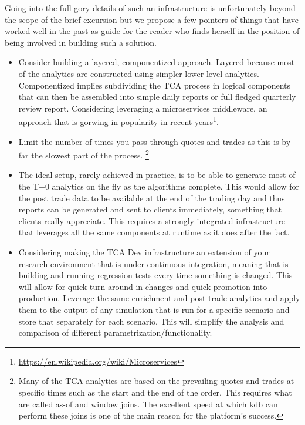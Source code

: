 Going into the full gory details of such an infrastructure is unfortunately beyond the scope of the brief excursion but we propose a few pointers of things that have worked well in the past as  guide for the reader who finds herself in the position of being involved in building such a solution.
\begin{itemize}
\item Consider building a layered, componentized approach. Layered because most of the analytics are constructed using simpler lower level analytics. Componentized implies subdividing the TCA process in logical components that can then be assembled into simple daily reports or full fledged quarterly review report. Considering leveraging a microservices middleware, an approach that is gorwing in popularity in recent years\footnote{\url{https://en.wikipedia.org/wiki/Microservices}}.

\item Limit the number of times you pass through quotes and trades as this is by far the slowest part of the process. \footnote{Many of the TCA analytics are based on the prevailing quotes and trades at specific times such as the start and the end of the order. This requires what are called  as-of and window joins. The excellent speed at which kdb can perform these joins is one of the main reason for the platform's success. }

\item The ideal setup, rarely achieved in practice, is to be able to generate most of the T+0 analytics on the fly as the algorithms complete. This would allow for the post trade data to be available at the end of the trading day and thus reports can be generated and sent to clients immediately, something that clients really appreciate. This requires a strongly integrated infrastructure that leverages all the same components at runtime as it does after the fact. 

\item Considering making the TCA Dev infrastructure an extension of your research environment that is under continuous integration, meaning that  is building and running regression tests every time something is changed. This will allow for quick turn around in changes and quick promotion into production. Leverage the same enrichment and post trade analytics and apply them to the output of any simulation that is run for a specific scenario and store that separately for each scenario. This will simplify the analysis and comparison of different  parametrization/functionality.


\end{itemize}
